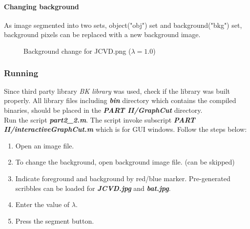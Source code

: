 \documentclass[paper=a4, fontsize=11pt]{scrartcl} %
\numberwithin{equation}{section} %
\numberwithin{figure}{section} %
\numberwithin{table}{section} %
\newcommand{\filename}[1]{\textbf{\textit{#1}}}
\begin{document}
\paragraph{Changing background}

As image segmented into two sets, object("obj") set and background("bkg") set, background pixels can be replaced with a new background image. 

\begin{figure}[H]
\caption{Background change for JCVD.png ($\lambda = 1.0$)\label{fig:simple}}
\centering
	\noindent{}
\end{figure}


\subsubsection{Running}

Since third party library \textit{BK library} was used, check if the library was built properly. All library files including \filename{bin} directory which contains the compiled binaries, should be placed in the \filename{PART II/GraphCut} directory. \\

Run the script \filename{part2\_2.m}. The script invoke subscript \filename{PART II/interactiveGraphCut.m} which is for GUI windows. Follow the steps below:

\begin{enumerate}
	\item Open an image file.
	\item To change the background, open background image file. (can be skipped)
	\item Indicate foreground and background by red/blue marker. Pre-generated scribbles can be loaded for \filename{JCVD.jpg} and \filename{bat.jpg}.
	\item Enter the value of $\lambda$.
	\item Press the segment button. 
\end{enumerate}
\end{document}
